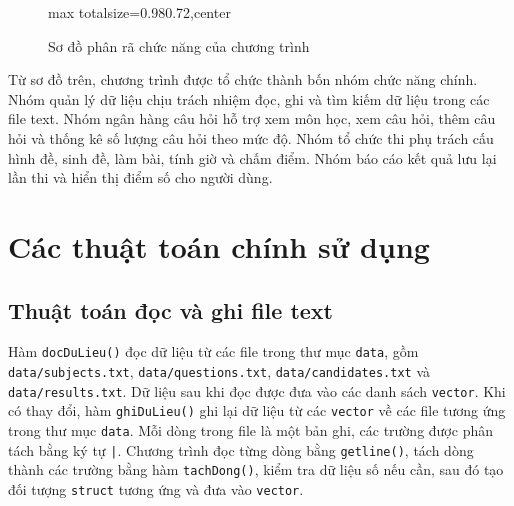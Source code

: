 \documentclass[12pt,a4paper]{report}
\begin{document}
\begin{figure}[H]
\begin{adjustbox}{max totalsize={0.98\textwidth}{0.72\textheight},center}
    \end{adjustbox}
    \caption{Sơ đồ phân rã chức năng của chương trình}
    \label{fig:so-do-phan-ra-chuc-nang}
\end{figure}

Từ sơ đồ trên, chương trình được tổ chức thành bốn nhóm chức năng chính. Nhóm quản lý dữ liệu chịu trách nhiệm đọc, ghi và tìm kiếm dữ liệu trong các file text. Nhóm ngân hàng câu hỏi hỗ trợ xem môn học, xem câu hỏi, thêm câu hỏi và thống kê số lượng câu hỏi theo mức độ. Nhóm tổ chức thi phụ trách cấu hình đề, sinh đề, làm bài, tính giờ và chấm điểm. Nhóm báo cáo kết quả lưu lại lần thi và hiển thị điểm số cho người dùng.

\section{Các thuật toán chính sử dụng}

\subsection{Thuật toán đọc và ghi file text}

Hàm \texttt{docDuLieu()} đọc dữ liệu từ các file trong thư mục \texttt{data}, gồm \texttt{data/subjects.txt}, \texttt{data/questions.txt}, \texttt{data/candidates.txt} và \texttt{data/results.txt}. Dữ liệu sau khi đọc được đưa vào các danh sách \texttt{vector}. Khi có thay đổi, hàm \texttt{ghiDuLieu()} ghi lại dữ liệu từ các \texttt{vector} về các file tương ứng trong thư mục \texttt{data}. Mỗi dòng trong file là một bản ghi, các trường được phân tách bằng ký tự \texttt{|}. Chương trình đọc từng dòng bằng \texttt{getline()}, tách dòng thành các trường bằng hàm \texttt{tachDong()}, kiểm tra dữ liệu số nếu cần, sau đó tạo đối tượng \texttt{struct} tương ứng và đưa vào \texttt{vector}.
\end{document}
